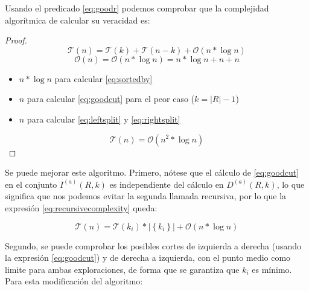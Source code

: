Usando el predicado \eqref{eq:goodr} podemos comprobar que la complejidad algorítmica de calcular su veracidad es:

\begin{proof}
  \begin{equation}
    \mathcal{T}(n)=\mathcal{T}(k)+\mathcal{T}(n-k)+\mathcal{O}(n*\log{n})
    \label{eq:recursivecomplexity}
  \end{equation}
  \begin{equation}
    \mathcal{O}(n)=\mathcal{O}(n*\log{n})=n*\log{n}+n+n
  \end{equation}
  \begin{itemize}
    \item \(n*\log{n}\) para calcular \eqref{eq:sortedby}
    \item \(n\) para calcular \eqref{eq:goodcut} para el peor caso (\(k=\left\lvert R\right\rvert-1\))
    \item \(n\) para calcular \eqref{eq:leftsplit} y \eqref{eq:rightsplit}
  \end{itemize}
  \begin{equation}
    \mathcal{T}(n)=\mathcal{O}(n^2*\log{n})
  \end{equation}
\end{proof}

Se puede mejorar este algoritmo. Primero, nótese que el cálculo de \eqref{eq:goodcut} en el conjunto \(I^{(a)}(R,k)\) es independiente del cálculo en \(D^{(a)}(R,k)\), lo que significa que nos podemos evitar la segunda llamada recursiva, por lo que la expresión \eqref{eq:recursivecomplexity} queda:

\begin{equation}
  \mathcal{T}(n)=\mathcal{T}(k_i)*\left\lvert\left\{ k_i\right\}\right\rvert +\mathcal{O}(n*\log{n})
  \label{eq:recursivecomplexity2}
\end{equation}

Segundo, se puede comprobar los posibles cortes de izquierda a derecha (usando la expresión \eqref{eq:goodcut}) y de derecha a izquierda, con el punto medio como limite para ambas exploraciones, de forma que se garantiza que \(k_i\) es mínimo. Para esta modificación del algoritmo:

